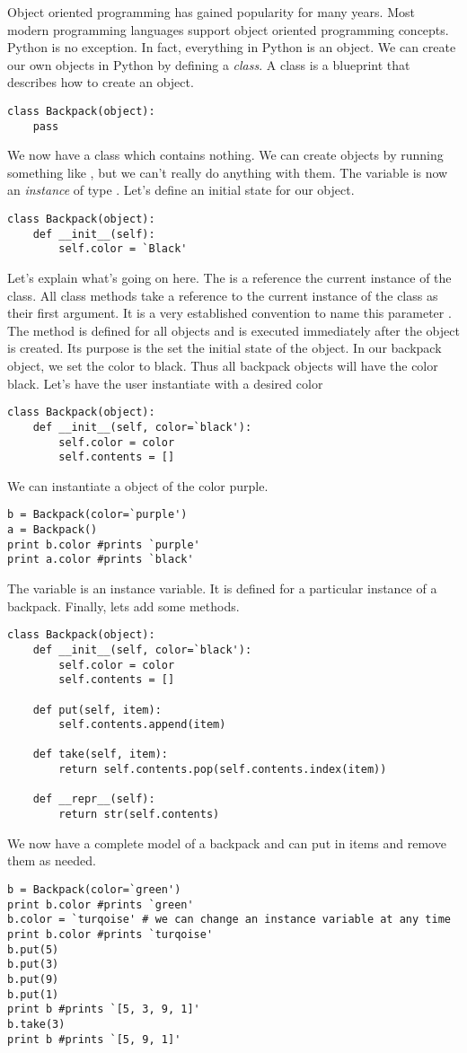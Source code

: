 Object oriented programming has gained popularity for many years.
Most modern programming languages support object oriented programming concepts.
Python is no exception.
In fact, everything in Python is an object.
We can create our own objects in Python by defining a \emph{class}.
A class is a blueprint that describes how to create an object.
\begin{lstlisting}
class Backpack(object):
    pass
\end{lstlisting}
We now have a class  which contains nothing.
We can create  objects by running something like , but we can't really do anything with them.
The variable  is now an \emph{instance} of type .
Let's define an initial state for our object.
\begin{lstlisting}
class Backpack(object):
    def __init__(self):
        self.color = `Black'
\end{lstlisting}
Let's explain what's going on here.
The  is a reference the current instance of the class.
All class methods take a reference to the current instance of the class as their first argument.
It is a very established convention to name this parameter .
The  method is defined for all objects and is executed immediately after the object is created.
Its purpose is the set the initial state of the object.
In our backpack object, we set the color to black.
Thus all backpack objects will have the color black.
Let's have the user instantiate with a desired color
\begin{lstlisting}
class Backpack(object):
    def __init__(self, color=`black'):
        self.color = color
        self.contents = []
\end{lstlisting}
We can instantiate a  object of the color purple.
\begin{lstlisting}
b = Backpack(color=`purple')
a = Backpack()
print b.color #prints `purple'
print a.color #prints `black'
\end{lstlisting}
The variable  is an instance variable.
It is defined for a particular instance of a backpack.
Finally, lets add some methods.
\begin{lstlisting}
class Backpack(object):
    def __init__(self, color=`black'):
        self.color = color
        self.contents = []
        
    def put(self, item):
        self.contents.append(item)
        
    def take(self, item):
        return self.contents.pop(self.contents.index(item))
        
    def __repr__(self):
        return str(self.contents)
\end{lstlisting}
We now have a complete model of a backpack and can put in items and remove them as needed.
\begin{lstlisting}
b = Backpack(color=`green')
print b.color #prints `green'
b.color = `turqoise' # we can change an instance variable at any time
print b.color #prints `turqoise'
b.put(5)
b.put(3)
b.put(9)
b.put(1)
print b #prints `[5, 3, 9, 1]'
b.take(3)
print b #prints `[5, 9, 1]'
\end{lstlisting}

